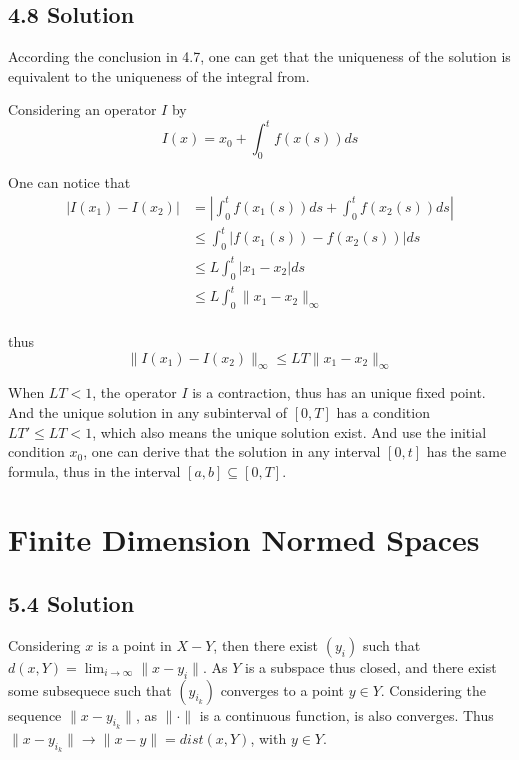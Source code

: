 \documentclass{article}
\begin{document}
\subsection*{4.8 Solution}
According the conclusion in 4.7, one can get that the uniqueness of the solution is equivalent to the uniqueness of the integral from.

Considering an operator \(I\) by 
\[I(x) = x_0 + \int_0^t f(x(s)) ds \]

One can notice that 
\begin{align*}
    |I(x_1) - I(x_2)| &= |\int_{0}^t f(x_1(s)) ds + \int_{0}^t f(x_2(s)) ds |\\
    &\le \int_{0}^t |f(x_1(s)) - f(x_2(s))| ds\\
    &\le L \int_{0}^t |x_1 - x_2| ds \\
    &\le L \int_{0}^t \|x_1 - x_2\|_{\infty} \\
\end{align*}

thus
\[\|I(x_1) - I(x_2)\|_{\infty} \le LT\|x_1 - x_2\|_{\infty}\]

When \(LT < 1\), the operator \(I\) is a contraction, thus has an unique fixed point. And the unique solution in any subinterval of \([0, T]\) has a condition \(LT' \le LT < 1\), which also means the unique solution exist. And use the initial condition \(x_0\), one can derive that the solution in any interval \([0, t]\) has the same formula, thus in the interval \([a, b] \subseteq [0, T]\).




\section{Finite Dimension Normed Spaces}

\subsection*{5.4 Solution}
Considering \(x\) is a point in \(X - Y\), then there exist \((y_i)\) such that \(d(x, Y) = \lim_{i \to \infty}\|x - y_i\|\). As \(Y\) is a subspace thus closed, and there exist some subsequece such that \((y_{i_k})\) converges to a point \(y \in Y\). Considering the sequence \(\|x - y_{i_k}\|\), as \(\|\cdot\|\) is a continuous function, is also converges. Thus \(\|x - y_{i_k}\| \to \|x - y\| = dist(x, Y)\), with \(y \in Y\).
\end{document}
